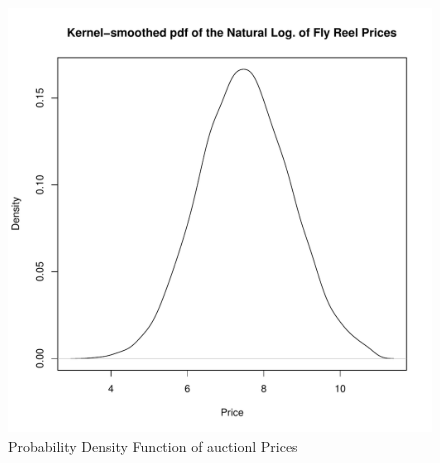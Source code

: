 \documentclass[11pt]{book}
\begin{document}
\begin{figure}[h!]
  \centering
  \includegraphics[scale = 0.5, keepaspectratio=true]{../Figures/density_prices}
  \caption{Probability Density Function of auctionl Prices} \label{fig:density_prices}
\end{figure}



\end{document}
